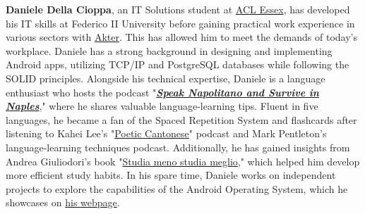 %
%

\textbf{Daniele Della Cioppa}, an IT Solutions student at \href{https://aclessex.com/about-us/}{ACL Essex}, has developed his IT skills at Federico II University before gaining practical work experience in various sectors with \href{https://www.akhter.co.uk/}{Akter}. This has allowed him to meet the demands of today's workplace. Daniele has a strong background in designing and implementing Android apps, utilizing TCP/IP and PostgreSQL databases while following the SOLID principles. Alongside his technical expertise, Daniele is a language enthusiast who hosts the podcast "\textbf{\emph{\href{https://open.spotify.com/show/05U0mbJEdy1PtqnXOTFHAR}{Speak Napolitano and Survive in Naples}}}," where he shares valuable language-learning tips. Fluent in five languages, he became a fan of the Spaced Repetition System and flashcards after listening to Kahei Lee's "\href{https://www.poeticcantonese.com/}{Poetic Cantonese}" podcast and Mark Pentleton's language-learning techniques podcast. Additionally, he has gained insights from Andrea Giuliodori's book "\href{https://www.efficacemente.com/}{Studia meno studia meglio}," which helped him develop more efficient study habits. In his spare time, Daniele works on independent projects to explore the capabilities of the Android Operating System, which he showcases on \href{https://danieledellacioppa.github.io/}{his webpage}.
